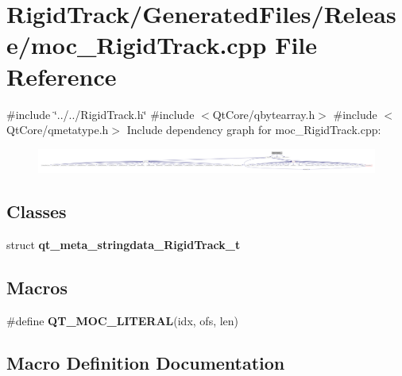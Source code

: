 \section{Rigid\+Track/\+Generated\+Files/\+Release/moc\+\_\+\+Rigid\+Track.cpp File Reference}
\label{_release_2moc___rigid_track_8cpp}
{\ttfamily \#include \char`\"{}../../\+Rigid\+Track.\+h\char`\"{}}\newline
{\ttfamily \#include $<$Qt\+Core/qbytearray.\+h$>$}\newline
{\ttfamily \#include $<$Qt\+Core/qmetatype.\+h$>$}\newline
Include dependency graph for moc\+\_\+\+Rigid\+Track.\+cpp\+:\nopagebreak
\begin{figure}[H]
\begin{center}
\leavevmode
\includegraphics[width=350pt]{_release_2moc___rigid_track_8cpp__incl}
\end{center}
\end{figure}
\subsection*{Classes}
\begin{DoxyCompactItemize}
\item 
struct \textbf{ qt\+\_\+meta\+\_\+stringdata\+\_\+\+Rigid\+Track\+\_\+t}
\end{DoxyCompactItemize}
\subsection*{Macros}
\begin{DoxyCompactItemize}
\item 
\#define \textbf{ Q\+T\+\_\+\+M\+O\+C\+\_\+\+L\+I\+T\+E\+R\+AL}(idx,  ofs,  len)
\end{DoxyCompactItemize}


\subsection{Macro Definition Documentation}
\mbox{\label{_release_2moc___rigid_track_8cpp_a75bb9482d242cde0a06c9dbdc6b83abe}} 
